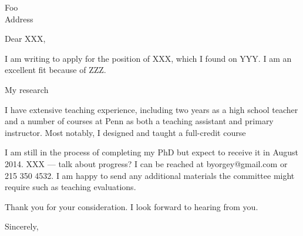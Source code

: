 \documentclass{letter}
\begin{document}
\begin{letter}{Foo \\ Address}

\opening{Dear XXX,}

I am writing to apply for the position of XXX, which I found on YYY.
I am an excellent fit because of ZZZ.

My research

I have extensive teaching experience, including two years as a high
school teacher and a number of courses at Penn as both a teaching
assistant and primary instructor.  Most notably, I designed and taught
a full-credit course



I am still in the process of completing my PhD but expect to receive
it in August 2014.  XXX --- talk about progress?  I can be reached at
\textsf{byorgey@gmail.com} or \textsf{215 350 4532}.  I am happy to
send any additional materials the committee might require such as
teaching evaluations.

Thank you for your consideration.  I look forward to hearing from you.

\closing{Sincerely,}

\end{letter}
\end{document}
